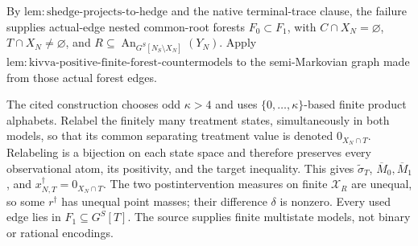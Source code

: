 By \(\mathrm{lem:shedge\text{-}projects\text{-}to\text{-}hedge}\) and the native terminal-trace clause, the failure supplies actual-edge nested common-root forests \(F_0\subset F_1\), with \(C\cap X_N=\varnothing\), \(T\cap X_N\ne\varnothing\), and \(R\subseteq\operatorname{An}_{G^S[N_S\setminus X_N]}(Y_N)\). Apply \(\mathrm{lem:kivva\text{-}positive\text{-}finite\text{-}forest\text{-}countermodels}\) to the semi-Markovian graph made from those actual forest edges.

The cited construction chooses odd \(\kappa>4\) and uses \(\{0,\ldots,\kappa\}\)-based finite product alphabets. Relabel the finitely many treatment states, simultaneously in both models, so that its common separating treatment value is denoted \(0_{X_N\cap T}\). Relabeling is a bijection on each state space and therefore preserves every observational atom, its positivity, and the target inequality. This gives \(\widetilde\sigma_T\), \(\overline M_0,\overline M_1\), and \(x_{N,T}^\dagger=0_{X_N\cap T}\). The two postintervention measures on finite \(\mathcal X_R\) are unequal, so some \(r^\dagger\) has unequal point masses; their difference \(\delta\) is nonzero. Every used edge lies in \(F_1\subseteq G^S[T]\). The source supplies finite multistate models, not binary or rational encodings.